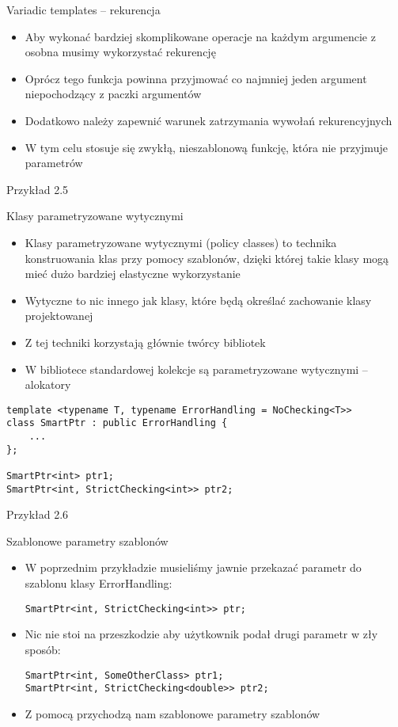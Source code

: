 \documentclass[11pt]{beamer}
\begin{document}
\begin{frame}[fragile]{Variadic templates -- rekurencja}
    \begin{itemize}
        \item Aby wykonać bardziej skomplikowane operacje na każdym argumencie z osobna musimy wykorzystać rekurencję
        \item Oprócz tego funkcja powinna przyjmować co najmniej jeden argument niepochodzący z paczki argumentów
        \item Dodatkowo należy zapewnić warunek zatrzymania wywołań rekurencyjnych
        \item W tym celu stosuje się zwykłą, nieszablonową funkcję, która nie przyjmuje parametrów
    \end{itemize}
    \alert{Przykład 2.5}
\end{frame}

\begin{frame}[fragile]{Klasy parametryzowane wytycznymi}
    \begin{itemize}
        \item Klasy parametryzowane wytycznymi (policy classes) to technika konstruowania klas przy pomocy szablonów, dzięki której takie klasy mogą mieć dużo bardziej elastyczne wykorzystanie
        \item Wytyczne to nic innego jak klasy, które będą określać zachowanie klasy projektowanej
        \item Z tej techniki korzystają głównie twórcy bibliotek
        \item W bibliotece standardowej kolekcje są parametryzowane wytycznymi -- alokatory
    \end{itemize}
    \begin{lstlisting}[frame=single, basicstyle=\tiny]
template <typename T, typename ErrorHandling = NoChecking<T>>
class SmartPtr : public ErrorHandling {
    ...
};

SmartPtr<int> ptr1;
SmartPtr<int, StrictChecking<int>> ptr2;
    \end{lstlisting}
    \alert{Przykład 2.6}
\end{frame}

\begin{frame}[fragile]{Szablonowe parametry szablonów}
    \begin{itemize}
        \item W poprzednim przykładzie musieliśmy jawnie przekazać parametr do szablonu klasy ErrorHandling:
        \begin{lstlisting}[frame=single]
SmartPtr<int, StrictChecking<int>> ptr;
    \end{lstlisting}
        \item Nic nie stoi na przeszkodzie aby użytkownik podał drugi parametr w zły sposób:
        \begin{lstlisting}[frame=single]
SmartPtr<int, SomeOtherClass> ptr1;
SmartPtr<int, StrictChecking<double>> ptr2;
    \end{lstlisting}
        \item Z pomocą przychodzą nam szablonowe parametry szablonów
    \end{itemize}
\end{frame}
\end{document}
